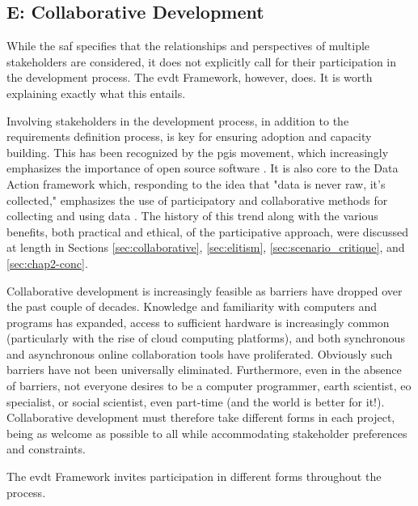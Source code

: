 \subsection{E: Collaborative Development} \label{sec:evdt-collab}

While the \ac{saf} specifies that the relationships and perspectives of multiple stakeholders are considered, it does not explicitly call for their participation in the development process. The \ac{evdt} Framework, however, does. It is worth explaining exactly what this entails.

Involving stakeholders in the development process, in addition to the requirements definition process, is key for ensuring adoption and capacity building. This has been recognized by the \ac{pgis} movement, which increasingly emphasizes the importance of open source software \cite{williamsonTheirworkDevelopmentSustainable2011, dodgeMappingModesMethods2011}. It is also core to the Data Action framework which, responding to the idea that "data is never raw, it's collected," emphasizes the use of participatory and collaborative methods for collecting and using data \cite{williamsDataActionUsing2020}. The history of this trend along with the various benefits, both practical and ethical, of the participative approach, were discussed at length in Sections \ref{sec:collaborative}, \ref{sec:elitism}, \ref{sec:scenario_critique}, and \ref{sec:chap2-conc}.

Collaborative development is increasingly feasible as barriers have dropped over the past couple of decades. Knowledge and familiarity with computers and programs has expanded, access to sufficient hardware is increasingly common (particularly with the rise of cloud computing platforms), and both synchronous and asynchronous online collaboration tools have proliferated. Obviously such barriers have not been universally eliminated. Furthermore, even in the absence of barriers, not everyone desires to be a computer programmer, earth scientist, \ac{eo} specialist, or social scientist, even part-time (and the world is better for it!). Collaborative development must therefore take different forms in each project, being as welcome as possible to all while accommodating stakeholder preferences and constraints.

The \ac{evdt} Framework invites participation in different forms throughout the process.

